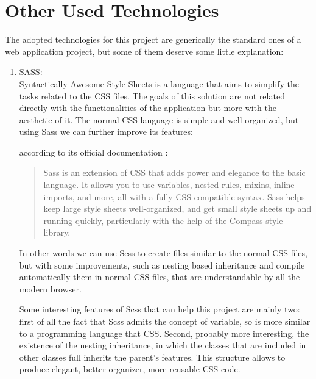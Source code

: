  
\section{Other Used Technologies}

The adopted technologies for this project are generically the standard ones of a web application project, but some of them deserve some little explanation:

\begin{enumerate}

\item
SASS:
\\
\noindent
Syntactically Awesome Style Sheets is a language that aims to simplify the tasks related to the CSS files. The goals of this solution are not related directly with the functionalities of the application but more with the aesthetic of it.
The normal CSS language is simple and well organized, but using Sass we can further improve its features:

according to its official documentation :
\begin{quote}
Sass is an extension of CSS that adds power and elegance to the basic language. It allows you to use variables, nested rules, mixins, inline imports, and more, all with a fully CSS-compatible syntax. Sass helps keep large style sheets well-organized, and get small style sheets up and running quickly, particularly with the help of the Compass style library.

\end{quote}

In other words we can use Scss to create files similar to the normal CSS files, but with some improvements, such as nesting based inheritance and compile automatically them in normal CSS files, that are understandable by all the modern browser.

Some interesting features of Scss that can help this project are mainly two:
first of all the fact that Scss admits the concept of variable, so is more similar to a programming language that CSS. Second, probably more interesting, the existence of the nesting inheritance, in which the classes that are included in other classes full inherits the parent's features. This structure allows to produce elegant, better organizer, more reusable CSS code.


\end{enumerate}
